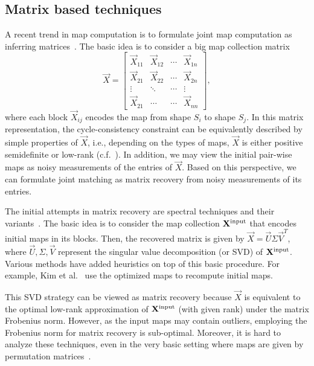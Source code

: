 \subsection{Matrix based techniques}



A recent trend in map computation is to formulate joint map computation as inferring matrices~\cite{Singer:2011:VDM,Huang:2012:OAE,Kim:2012:FC,Huang:2013:SDP,journals/corr/abs-1211-2441,Chen:2014:SDP,Huang:2014:FMN}. The basic idea is to consider a big map collection matrix
$$
\vec{X} = \left [
\begin{array}{cccc}
\vec{X}_{11} & \vec{X}_{12} & \cdots & \vec{X}_{1n} \\
\vec{X}_{21} & \vec{X}_{22} & \cdots & \vec{X}_{2n} \\
\vdots & \ddots & \cdots & \vdots \\
\vec{X}_{21} & \cdots & \cdots & \vec{X}_{nn}
\end{array}
\right],
$$
where each block $\vec{X}_{ij}$ encodes the map from shape $S_i$ to shape $S_j$. In this matrix representation, the cycle-consistency constraint can be equivalently described by simple properties of $\vec{X}$, i.e., depending on the types of maps, $\vec{X}$ is either positive semidefinite or low-rank (c.f.~\cite{Huang:2013:SDP,Huang:2014:FMN}). In addition, we may view the initial pair-wise maps as noisy measurements of the entries of $\vec{X}$. Based on this perspective, we can formulate joint matching as matrix recovery from noisy measurements of its entries.

 The initial attempts in matrix recovery are spectral techniques and their variants~\cite{Singer:2011:VDM,Kim:2012:FC,Wang:2013:FMap}. The basic idea is to consider the map collection $\vec{X}^{\textup{input}}$ that encodes initial maps in its blocks. Then, the recovered matrix is given by $\vec{X} = \vec{U}\Sigma \vec{V}^{T}$, where $\vec{U}, \Sigma, \vec{V}$ represent the singular value decomposition (or SVD) of $\vec{X}^{\textup{input}}$. Various methods have added heuristics on top of this basic procedure. For example, Kim et al.~\cite{Kim:2012:FC} use the optimized maps to recompute initial maps.

This SVD strategy can be viewed as matrix recovery because $\vec{X}$ is equivalent to the optimal low-rank approximation of $\vec{X}^{\textup{input}}$ (with given rank) under the matrix Frobenius norm. However, as the input maps may contain outliers, employing the Frobenius norm for matrix recovery is sub-optimal. Moreover, it is hard to analyze these techniques, even in the very basic setting where maps are given by permutation matrices~\cite{conf/nips/PachauriKS13}.


